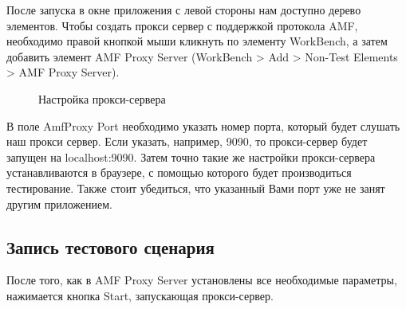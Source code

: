 После запуска в окне приложения с левой стороны нам доступно дерево элементов. Чтобы создать прокси сервер
с поддержкой протокола AMF, необходимо правой кнопкой мыши кликнуть по элементу WorkBench,
а затем добавить элемент AMF Proxy Server (WorkBench > Add > Non-Test Elements > AMF Proxy Server).

\begin{figure}[ht]
\caption{Настройка прокси-сервера}
\label{ris:proxySettings.png}
\end{figure}

В поле AmfProxy Port необходимо указать номер порта, который будет слушать наш прокси сервер.
Если указать, например, 9090, то прокси-сервер будет запущен на localhost:9090.
Затем точно такие же настройки прокси-сервера устанавливаются в браузере, с помощью которого будет
производиться тестирование. Также стоит убедиться, что указанный Вами порт уже не занят другим приложением.

\subsection{Запись тестового сценария}

После того, как в AMF Proxy Server установлены все необходимые параметры, нажимается кнопка Start,
запускающая прокси-сервер.

